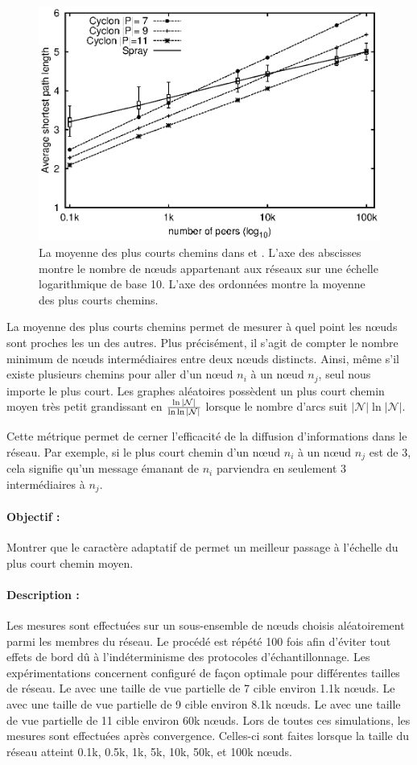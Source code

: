 \begin{figure}
  \centering
  \includegraphics[width=.8\textwidth]{img/spray/avgpath.eps}
  \caption{\label{net:fig:shortestpath} La moyenne des plus courts chemins dans
    \SPRAY et \CYCLON. L'axe des abscisses montre le nombre de nœuds appartenant
    aux réseaux sur une échelle logarithmique de base 10. L'axe des ordonnées
    montre la moyenne des plus courts chemins.}
\end{figure}

La moyenne des plus courts chemins permet de mesurer à quel point les nœuds sont
proches les un des autres. Plus précisément, il s'agit de compter le nombre
minimum de nœuds intermédiaires entre deux nœuds distincts. Ainsi, même s'il
existe plusieurs chemins pour aller d'un nœud $n_i$ à un nœud $n_j$, seul nous
importe le plus court.  Les graphes aléatoires possèdent un plus court chemin
moyen très petit grandissant en $\ln|\mathcal{N}|\over\ln\ln|\mathcal{N}|$
lorsque le nombre d'arcs suit $|\mathcal{N}|\ln|\mathcal{N}|$.

Cette métrique permet de cerner l'efficacité de la diffusion d'informations dans
le réseau. Par exemple, si le plus court chemin d'un nœud $n_i$ à un nœud $n_j$
est de 3, cela signifie qu'un message émanant de $n_i$ parviendra en seulement 3
intermédiaires à $n_j$.

\paragraph{Objectif :} Montrer que le caractère adaptatif de \SPRAY permet un
meilleur passage à l'échelle du plus court chemin moyen.

\paragraph{Description :} Les mesures sont effectuées sur un sous-ensemble de
nœuds choisis aléatoirement parmi les membres du réseau. Le procédé est répété
100 fois afin d'éviter tout effets de bord dû à l'indéterminisme des protocoles
d'échantillonnage. Les expérimentations concernent \CYCLON configuré de façon
optimale pour différentes tailles de réseau. Le \CYCLON avec une taille de vue
partielle de 7 cible environ 1.1k nœuds. Le \CYCLON avec une taille de vue
partielle de 9 cible environ 8.1k nœuds. Le \CYCLON avec une taille de vue
partielle de 11 cible environ 60k nœuds. Lors de toutes ces simulations, les
mesures sont effectuées après convergence. Celles-ci sont faites lorsque la
taille du réseau atteint 0.1k, 0.5k, 1k, 5k, 10k, 50k, et 100k nœuds.

